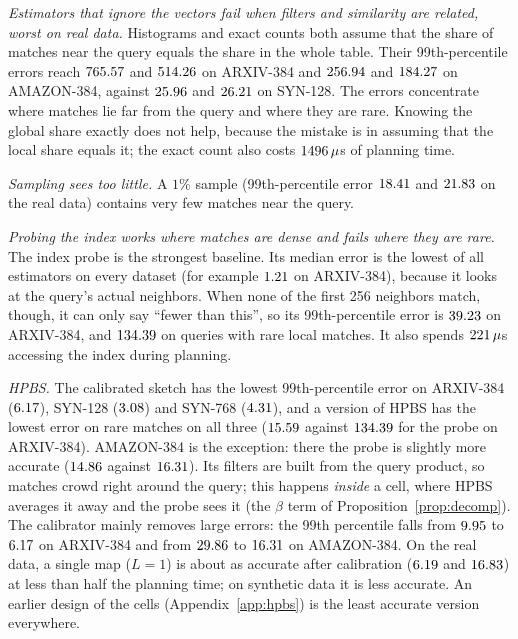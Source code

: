 \documentclass[sigconf,nonacm]{acmart}
\begin{document}
\emph{Estimators that ignore the vectors fail when filters and similarity are related, worst on real data.} Histograms and exact counts both assume that the share of matches near the query equals the share in the whole table. Their 99th-percentile errors reach $765.57$ and $514.26$ on ARXIV-384 and $256.94$ and $184.27$ on AMAZON-384, against $25.96$ and $26.21$ on SYN-128. The errors concentrate where matches lie far from the query and where they are rare. Knowing the global share exactly does not help, because the mistake is in assuming that the local share equals it; the exact count also costs $1496\,\mu$s of planning time.

\emph{Sampling sees too little.} A $1\%$ sample (99th-percentile error $18.41$ and $21.83$ on the real data) contains very few matches near the query.

\emph{Probing the index works where matches are dense and fails where they are rare.} The index probe is the strongest baseline. Its median error is the lowest of all estimators on every dataset (for example $1.21$ on ARXIV-384), because it looks at the query's actual neighbors. When none of the first 256 neighbors match, though, it can only say ``fewer than this'', so its 99th-percentile error is $39.23$ on ARXIV-384, and $134.39$ on queries with rare local matches. It also spends $221\,\mu$s accessing the index during planning.

\emph{HPBS.} The calibrated sketch has the lowest 99th-percentile error on ARXIV-384 ($6.17$), SYN-128 ($3.08$) and SYN-768 ($4.31$), and a version of HPBS has the lowest error on rare matches on all three ($15.59$ against $134.39$ for the probe on ARXIV-384). AMAZON-384 is the exception: there the probe is slightly more accurate ($14.86$ against $16.31$). Its filters are built from the query product, so matches crowd right around the query; this happens \emph{inside} a cell, where HPBS averages it away and the probe sees it (the $\beta$ term of Proposition~\ref{prop:decomp}). The calibrator mainly removes large errors: the 99th percentile falls from $9.95$ to $6.17$ on ARXIV-384 and from $29.86$ to $16.31$ on AMAZON-384. On the real data, a single map ($L=1$) is about as accurate after calibration ($6.19$ and $16.83$) at less than half the planning time; on synthetic data it is less accurate. An earlier design of the cells (Appendix~\ref{app:hpbs}) is the least accurate version everywhere.
\end{document}
